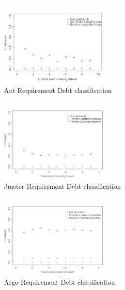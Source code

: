 \clearpage
 
\begin{figure}[thb!]    
  \centering
  \includegraphics[width=0.50\textwidth]{figures/appendix/iteration_details/implementation_ant.pdf}
  \vspace{-3mm}
  \caption{Ant Requirement Debt classification}
  \label{fig:implementation_ant}
\end{figure}

\begin{figure}[thb!]
  \centering
  \includegraphics[width=0.50\textwidth]{figures/appendix/iteration_details/implementation_jmeter.pdf}
  \vspace{-3mm}
  \caption{Jmeter Requirement Debt classification}
  \label{fig:implementation_jmeter}
\end{figure}

\begin{figure}[thb!]
  \centering
  \includegraphics[width=0.50\textwidth]{figures/appendix/iteration_details/implementation_argo.pdf}
  \vspace{-3mm}
  \caption{Argo Requirement Debt classification}
  \label{fig:implementation_argo}
\end{figure}

